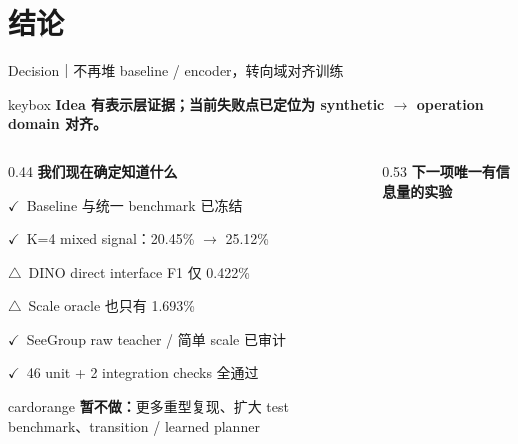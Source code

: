 \documentclass{beamer}
\newcommand{\ok}{\textcolor{good}{\ensuremath{\checkmark}}}
\newcommand{\caution}{\textcolor{warn}{\ensuremath{\triangle}}}
\newcommand{\cardtitle}[1]{\textcolor{maincolor}{\bfseries #1}}
\begin{document}
\section{结论}

\begin{frame}{Decision｜不再堆 baseline / encoder，转向域对齐训练}
\vspace{-0.45em}
\begin{beamercolorbox}[wd=\linewidth,sep=0.75em,rounded=true]{keybox}
\centering
\large\bfseries Idea 有表示层证据；当前失败点已定位为 synthetic $\rightarrow$ operation domain 对齐。
\end{beamercolorbox}

\vspace{0.4em}
\begin{columns}[T,onlytextwidth]
  \begin{column}{0.44\textwidth}
    \cardtitle{我们现在确定知道什么}

    \vspace{0.35em}\small
    \ok\ Baseline 与统一 benchmark 已冻结

    \ok\ K=4 mixed signal：20.45\% $\rightarrow$ 25.12\%

    \caution\ DINO direct interface F1 仅 0.422\%

    \caution\ Scale oracle 也只有 1.693\%

    \ok\ SeeGroup raw teacher / 简单 scale 已审计

    \ok\ 46 unit + 2 integration checks 全通过

    \vspace{0.55em}
    \begin{beamercolorbox}[wd=\linewidth,sep=0.5em,rounded=true]{cardorange}
      \centering\scriptsize
      \textbf{暂不做：}更多重型复现、扩大 test benchmark、transition / learned planner
    \end{beamercolorbox}
  \end{column}
  \begin{column}{0.53\textwidth}
    \cardtitle{下一项唯一有信息量的实验}


\end{column}
\end{columns}
\end{frame}
\end{document}
